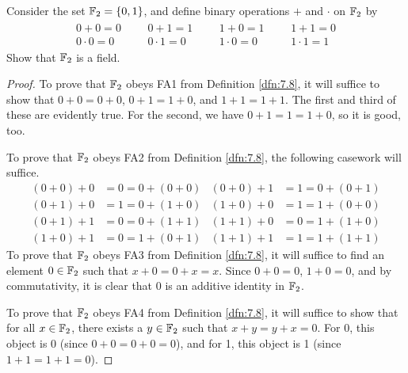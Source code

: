 \documentclass[../main.tex]{subfiles}
\begin{document}
\begin{exercise}\label{exr:7.9}
    Consider the set $\mathbb{F}_2=\{0,1\}$, and define binary operations $+$ and $\cdot$ on $\mathbb{F}_2$ by
    \begin{align*}
        \begin{split}
            0+0 = 0\\
            0\cdot 0 = 0
        \end{split}&&
        \begin{split}
            0+1 = 1\\
            0\cdot 1 = 0
        \end{split}&&
        \begin{split}
            1+0 = 1\\
            1\cdot 0 = 0
        \end{split}&&
        \begin{split}
            1+1 = 0\\
            1\cdot 1 = 1
        \end{split}
    \end{align*}
    Show that $\mathbb{F}_2$ is a field.
    \begin{proof}
        To prove that $\mathbb{F}_2$ obeys FA1 from Definition \ref{dfn:7.8}, it will suffice to show that $0+0=0+0$, $0+1=1+0$, and $1+1=1+1$. The first and third of these are evidently true. For the second, we have $0+1=1=1+0$, so it is good, too.\par
        To prove that $\mathbb{F}_2$ obeys FA2 from Definition \ref{dfn:7.8}, the following casework will suffice.
        \begin{align*}
            (0+0)+0 &= 0 = 0+(0+0)&
            (0+0)+1 &= 1 = 0+(0+1)\\
            (0+1)+0 &= 1 = 0+(1+0)&
            (1+0)+0 &= 1 = 1+(0+0)\\
            (0+1)+1 &= 0 = 0+(1+1)&
            (1+1)+0 &= 0 = 1+(1+0)\\
            (1+0)+1 &= 0 = 1+(0+1)&
            (1+1)+1 &= 1 = 1+(1+1)
        \end{align*}
        To prove that $\mathbb{F}_2$ obeys FA3 from Definition \ref{dfn:7.8}, it will suffice to find an element $0\in\mathbb{F}_2$ such that $x+0=0+x=x$. Since $0+0=0$, $1+0=0$, and by commutativity, it is clear that 0 is an additive identity in $\mathbb{F}_2$.\par
        To prove that $\mathbb{F}_2$ obeys FA4 from Definition \ref{dfn:7.8}, it will suffice to show that for all $x\in\mathbb{F}_2$, there exists a $y\in\mathbb{F}_2$ such that $x+y=y+x=0$. For 0, this object is 0 (since $0+0=0+0=0$), and for 1, this object is 1 (since $1+1=1+1=0$).\par

\end{proof}
\end{exercise}
\end{document}

